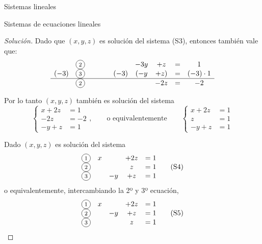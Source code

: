 \begin{chapter}{Sistemas lineales}
\begin{section}{Sistemas de ecuaciones lineales}
\begin{proof}[Solución]
 
Dado que $(x,y,z)$ es solución del sistema (S3), entonces también vale que: 
\begin{equation*}
\begin{matrix}
& \text{\footnotesize\circled{2}}&\qquad&& -3y & +z & = & 1 \\
(-3)& \text{\footnotesize\circled{3}}&\qquad&(-3)&( -y & +z) & = &(-3)\cdot1 \\
\hline
& \text{\footnotesize\circled{2}}&\qquad&&   & -2z & = & -2  
\end{matrix}
\end{equation*}

 
Por lo tanto $(x,y,z)$ también es solución del sistema
\begin{equation*}
    \begin{cases}
        x  +2z  &= 1 \\
 -2z & = -2\\
 -y  +z & =1 
    \end{cases},
\qquad\mbox{o equivalentemente}\qquad
\begin{cases}
x +2z & = 1 \\
 z & = 1\\
 -y  +z & =1 
\end{cases}
\end{equation*}
 

 
Dado $(x,y,z)$ es solución del sistema
\begin{equation*}
\begin{matrix}
    \text{\footnotesize\circled{1}}&x &  & +2z & = 1 \\
    \text{\footnotesize\circled{2}}&&    & z & = 1 \\
    \text{\footnotesize\circled{3}}&& -y & +z & =1
\end{matrix}\tag{S4}
\end{equation*}
o equivalentemente, intercambiando la 2º y 3º ecuación,  
\begin{equation*}
\begin{matrix}
    \text{\footnotesize\circled{1}}&x &  & +2z & = 1 \\
    \text{\footnotesize\circled{2}}&& -y & +z & =1\\
    \text{\footnotesize\circled{3}}&&    & z & = 1 
\end{matrix}\tag{S5}
\end{equation*}


\end{proof}
\end{section}
\end{chapter}
